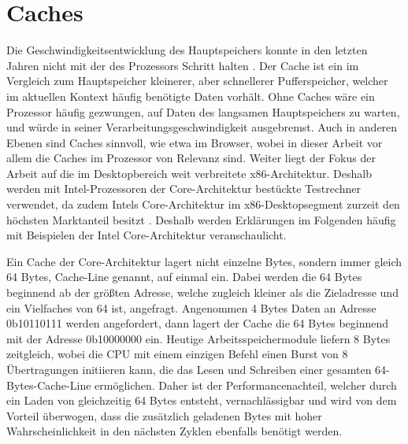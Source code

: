 \section{Caches}

Die Geschwindigkeitsentwicklung des Hauptspeichers konnte in den letzten Jahren nicht mit der des Prozessors Schritt halten . Der Cache ist ein im Vergleich zum Hauptspeicher kleinerer, aber schnellerer Pufferspeicher, welcher im aktuellen Kontext häufig benötigte Daten vorhält. 
Ohne Caches wäre ein Prozessor häufig gezwungen, auf Daten des langsamen Hauptspeichers zu warten, und würde in seiner Verarbeitungsgeschwindigkeit ausgebremst. 
Auch in anderen Ebenen sind Caches sinnvoll, wie etwa im Browser, wobei in dieser Arbeit vor allem die Caches im Prozessor von Relevanz sind. 
Weiter liegt der Fokus der Arbeit auf die im Desktopbereich weit verbreitete x86-Architektur. Deshalb werden mit Intel-Prozessoren der Core-Architektur bestückte Testrechner verwendet, da zudem Intels Core-Architektur im x86-Desktopsegment zurzeit den höchsten Marktanteil besitzt \cite{AMDIntelMarketShare}. Deshalb werden Erklärungen im Folgenden häufig mit Beispielen der Intel Core-Architektur veranschaulicht. 

Ein Cache der Core-Architektur lagert nicht einzelne Bytes, sondern immer gleich 64 Bytes, Cache-Line genannt, auf einmal ein. Dabei werden die 64 Bytes beginnend ab der größten Adresse, welche zugleich kleiner als die Zieladresse und ein Vielfaches von 64 ist, angefragt.
Angenommen 4 Bytes Daten an Adresse 0b10110111  werden angefordert, dann lagert der Cache die 64 Bytes beginnend mit der Adresse 0b10000000 ein.
Heutige Arbeitsspeichermodule liefern 8 Bytes zeitgleich, wobei die CPU mit einem einzigen Befehl einen Burst von 8 Übertragungen initiieren kann, die das Lesen und Schreiben einer gesamten 64-Bytes-Cache-Line ermöglichen.
Daher ist der Performancenachteil, welcher durch ein Laden von gleichzeitig 64 Bytes entsteht, vernachlässigbar und wird von dem Vorteil überwogen, dass die zusätzlich geladenen Bytes mit hoher Wahrscheinlichkeit in den nächsten Zyklen ebenfalls benötigt werden. 

